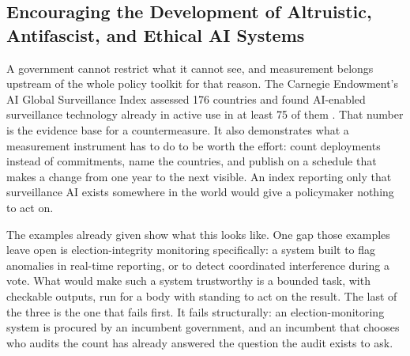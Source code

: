 \subsection{Encouraging the Development of Altruistic, Antifascist, and Ethical AI Systems}
\label{sec:9.1.4}
A government cannot restrict what it cannot see, and measurement belongs upstream of the whole policy toolkit for that reason. The Carnegie Endowment's AI Global Surveillance Index assessed 176 countries and found AI-enabled surveillance technology already in active use in at least 75 of them \autocite{feldstein2019globalexpansion}. That number is the evidence base for a countermeasure. It also demonstrates what a measurement instrument has to do to be worth the effort: count deployments instead of commitments, name the countries, and publish on a schedule that makes a change from one year to the next visible. An index reporting only that surveillance AI exists somewhere in the world would give a policymaker nothing to act on.

The examples already given show what this looks like. One gap those examples leave open is election-integrity monitoring specifically: a system built to flag anomalies in real-time reporting, or to detect coordinated interference during a vote. What would make such a system trustworthy is a bounded task, with checkable outputs, run for a body with standing to act on the result. The last of the three is the one that fails first. It fails structurally: an election-monitoring system is procured by an incumbent government, and an incumbent that chooses who audits the count has already answered the question the audit exists to ask.
